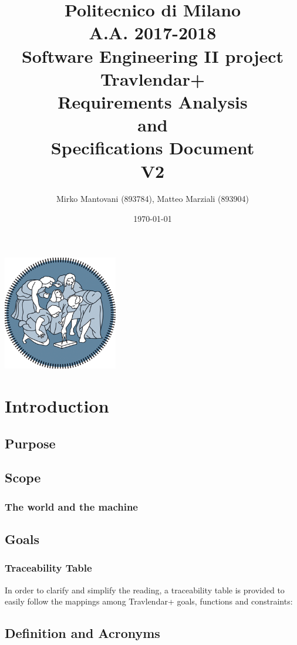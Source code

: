 \documentclass{article}
\author{Mirko Mantovani (893784), Matteo Marziali (893904)}
\date{\today}
\title{Politecnico di Milano
	\\A.A. 2017\@-\@2018
	\\Software Engineering II project \\ \textbf{Travlendar+}
	\\\textbf{R}equirements \textbf{A}nalysis \\and\\ \textbf{S}pecifications \textbf{D}ocument \\\textbf{V2}}
\begin{document}
\maketitle
\begin{center}
	\includegraphics[width=5cm]{polimi-logo}
\end{center}
\clearpage
{\hypersetup{hidelinks}\tableofcontents}
\clearpage

\section{Introduction}

\subsection{Purpose}



\newpage
\subsection{Scope}

\subsubsection{The world and the machine}

\clearpage
\subsection{Goals}

\subsubsection{Traceability Table}
In order to clarify and simplify the reading, a traceability table is provided to easily follow the mappings among Travlendar+ goals, functions and constraints: \\

\clearpage

\subsection{Definition and Acronyms}
\end{document}
